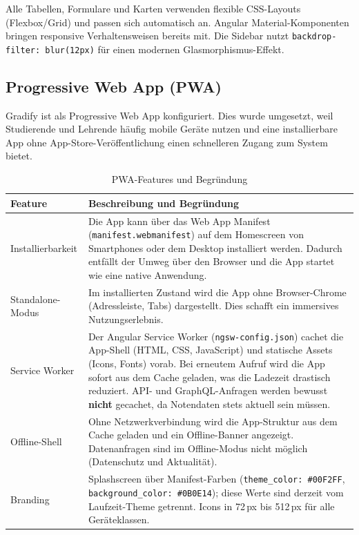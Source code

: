 \documentclass[12pt,a4paper,ngerman]{article}
\begin{document}
Alle Tabellen, Formulare und Karten verwenden flexible CSS-Layouts (Flexbox/Grid) und passen sich automatisch an. Angular Material-Komponenten bringen responsive Verhaltensweisen bereits mit. Die Sidebar nutzt \texttt{backdrop-filter: blur(12px)} für einen modernen Glasmorphismus-Effekt.

\subsection{Progressive Web App (PWA)}

Gradify ist als Progressive Web App konfiguriert. Dies wurde umgesetzt, weil Studierende und Lehrende häufig mobile Geräte nutzen und eine installierbare App ohne App-Store-Veröffentlichung einen schnelleren Zugang zum System bietet.

\begin{table}[H]
\centering
\caption{PWA-Features und Begründung}
\begin{tabular}{lL{9cm}}
\toprule
\textbf{Feature} & \textbf{Beschreibung und Begründung} \\
\midrule
Installierbarkeit & Die App kann über das Web App Manifest (\texttt{manifest.webmanifest}) auf dem Homescreen von Smartphones oder dem Desktop installiert werden. Dadurch entfällt der Umweg über den Browser und die App startet wie eine native Anwendung. \\
Standalone-Modus & Im installierten Zustand wird die App ohne Browser-Chrome (Adressleiste, Tabs) dargestellt. Dies schafft ein immersives Nutzungserlebnis. \\
Service Worker & Der Angular Service Worker (\texttt{ngsw-config.json}) cachet die App-Shell (HTML, CSS, JavaScript) und statische Assets (Icons, Fonts) vorab. Bei erneutem Aufruf wird die App sofort aus dem Cache geladen, was die Ladezeit drastisch reduziert. API- und GraphQL-Anfragen werden bewusst \textbf{nicht} gecachet, da Notendaten stets aktuell sein müssen. \\
Offline-Shell & Ohne Netzwerkverbindung wird die App-Struktur aus dem Cache geladen und ein Offline-Banner angezeigt. Datenanfragen sind im Offline-Modus nicht möglich (Datenschutz und Aktualität). \\
Branding & Splashscreen über Manifest-Farben (\texttt{theme\_color: \#00F2FF}, \texttt{background\_color: \#0B0E14}); diese Werte sind derzeit vom Laufzeit-Theme getrennt. Icons in 72\,px bis 512\,px für alle Geräteklassen. \\
\bottomrule
\end{tabular}
\end{table}
\end{document}
